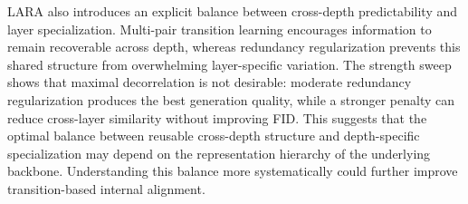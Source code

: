LARA also introduces an explicit balance between cross-depth predictability and layer specialization. Multi-pair transition learning encourages information to remain recoverable across depth, whereas redundancy regularization prevents this shared structure from overwhelming layer-specific variation. The strength sweep shows that maximal decorrelation is not desirable: moderate redundancy regularization produces the best generation quality, while a stronger penalty can reduce cross-layer similarity without improving FID. This suggests that the optimal balance between reusable cross-depth structure and depth-specific specialization may depend on the representation hierarchy of the underlying backbone. Understanding this balance more systematically could further improve transition-based internal alignment.
